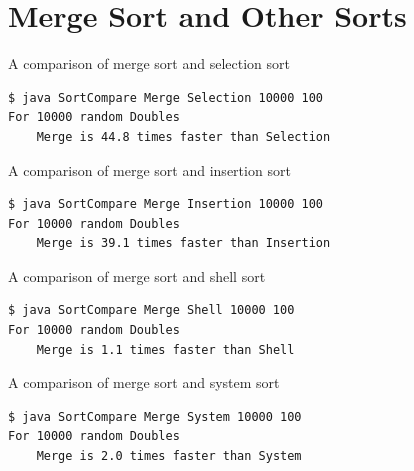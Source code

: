 \documentclass[8pt,a4paper,compress]{beamer}
\begin{document}
\section{Merge Sort and Other Sorts}
\begin{frame}[fragile]
\pause

A comparison of merge sort and selection sort

\smallskip

\begin{lstlisting}[language={},style=focusin]
$ java SortCompare Merge Selection 10000 100
For 10000 random Doubles
    Merge is 44.8 times faster than Selection
\end{lstlisting}

\pause
\bigskip

A comparison of merge sort and insertion sort

\smallskip

\begin{lstlisting}[language={},style=focusin]
$ java SortCompare Merge Insertion 10000 100
For 10000 random Doubles
    Merge is 39.1 times faster than Insertion
\end{lstlisting}

\pause
\bigskip

A comparison of merge sort and shell sort

\smallskip

\begin{lstlisting}[language={},style=focusin]
$ java SortCompare Merge Shell 10000 100
For 10000 random Doubles
    Merge is 1.1 times faster than Shell
\end{lstlisting}

\pause
\bigskip

A comparison of merge sort and system sort

\smallskip

\begin{lstlisting}[language={},style=focusin]
$ java SortCompare Merge System 10000 100
For 10000 random Doubles
    Merge is 2.0 times faster than System
\end{lstlisting}
\end{frame}
\end{document}
